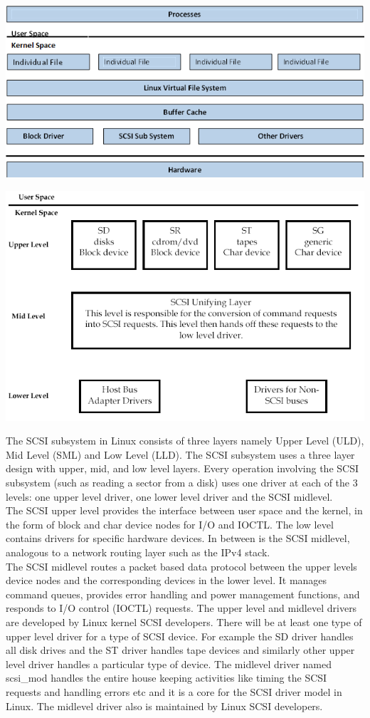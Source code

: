 \includegraphics[scale=.9]
{fig2}

\includegraphics[scale=.9]
{fig3}


The SCSI subsystem in Linux consists of three layers namely Upper Level (ULD), Mid Level (SML) and Low Level (LLD).  The SCSI subsystem uses a three layer design with upper, mid, and low level layers. Every operation involving the SCSI subsystem (such as reading a sector from a disk) uses one driver at each of the 3 levels: one upper level driver, one lower level driver and the SCSI midlevel.\\

The SCSI upper level provides the interface between user space and the kernel, in the form of block and char device nodes for I/O and IOCTL. The low level contains drivers for specific hardware devices. In between is the SCSI midlevel, analogous to a network routing layer such as the IPv4 stack. \\

The SCSI midlevel routes a packet based data protocol between the upper levels device nodes and the corresponding devices in the lower level. It manages command queues, provides error handling and power management functions, and responds to I/O control (IOCTL) requests. The upper level and midlevel drivers are developed by Linux kernel SCSI developers.  There will be at least one type of upper level driver for a type of SCSI device. For example the SD driver handles all disk drives and the ST driver handles tape devices and similarly other upper level driver handles a particular type of device. The midlevel driver named scsi\_mod handles the entire house keeping activities like timing the SCSI requests and handling errors etc and it is a core for the SCSI driver model in Linux.  The midlevel driver also is maintained by Linux SCSI developers. \\

